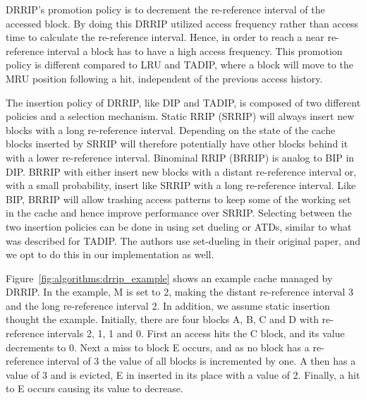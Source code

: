 DRRIP's promotion policy is to decrement the re-reference interval of the accessed block.
By doing this DRRIP utilized access frequency rather than access time to calculate the re-reference interval.
Hence, in order to reach a near re-reference interval a block has to have a high access frequency.
This promotion policy is different compared to LRU and TADIP, where a block will move to the MRU position following a hit, independent of the previous access history.

The insertion policy of DRRIP, like DIP and TADIP, is composed of two different policies and a selection mechanism.
Static RRIP (SRRIP) will always insert new blocks with a long re-reference interval. 
Depending on the state of the cache blocks inserted by SRRIP will therefore potentially have other blocks behind it with a lower re-reference interval.
Binominal RRIP (BRRIP) is analog to BIP in DIP.
BRRIP with either insert new blocks with a distant re-reference interval or, with a small probability, insert like SRRIP with a long re-reference interval.
Like BIP, BRRIP will allow trashing access patterns to keep some of the working set in the cache and hence improve performance over SRRIP.
Selecting between the two insertion policies can be done in using set dueling or ATDs, similar to what was described for TADIP.
The authors use set-dueling in their original paper, and we opt to do this in our implementation as well.

Figure~\ref{fig:algorithms:drrip_example} shows an example cache managed by DRRIP.
In the example, M is set to 2, making the distant re-reference interval 3 and the long re-reference interval 2. 
In addition, we assume static insertion thought the example.
Initially, there are four blocks A, B, C and D with re-reference intervals 2, 1, 1 and 0.
First an access hits the C block, and its value decrements to 0.
Next a miss to block E occurs, and as no block has a re-reference interval of 3 the value of all blocks is incremented by one. 
A then has a value of 3 and is evicted, E in inserted in its place with a value of 2.
Finally, a hit to E occurs causing its value to decrease.